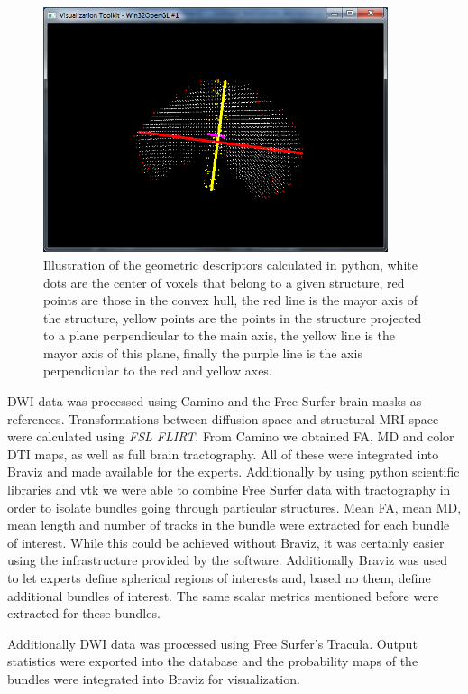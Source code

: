 \begin{figure}
	\centering
		\includegraphics[width=0.9\textwidth]{figures/kmc400/desc_4}
	\caption{Illustration of the geometric descriptors calculated in python, white dots are the center of voxels that belong to a given structure, red points are those in the convex hull, the red line is the mayor axis of the structure, yellow points are the points in the structure projected to a plane perpendicular to the main axis, the yellow line is the mayor axis of this plane, finally the purple line is the axis perpendicular to the red and yellow axes.}
	\label{fig_jth_descs}
\end{figure}

DWI data was processed using Camino and the Free Surfer brain masks as references. Transformations between diffusion space and structural MRI space were calculated using \emph{FSL FLIRT}. From Camino we obtained FA, MD and color DTI maps, as well as full brain tractography. All of these were integrated into Braviz and made available for the experts. Additionally by using python scientific libraries and vtk we were able to combine Free Surfer data with tractography in order to isolate bundles going through particular structures. Mean FA, mean MD, mean length and number of tracks in the bundle were extracted for each bundle of interest.  While this could be achieved without Braviz, it was certainly easier using the infrastructure provided by the software. Additionally Braviz was used to let experts define spherical regions of interests and, based no them, define additional bundles of interest. The same scalar metrics mentioned before were extracted for these bundles. 

Additionally DWI data was processed using Free Surfer's Tracula. Output statistics were exported into the database and the probability maps of the bundles were integrated into Braviz for visualization. 


